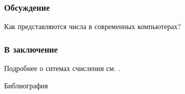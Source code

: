 \begin{frame}
    \frametitle{Обсуждение}
    
    Как представляются числа в современных компьютерах?
\end{frame}


\appendix

\begin{frame}
    \frametitle{В заключение}
    
    Подробнее о ситемах счисления см. \cite{bib:gorbatov:fodm,bib:sudoplatov:discrmath}.
\end{frame}


\begin{frame}[allowframebreaks]{Библиография}
    
    
\end{frame}

